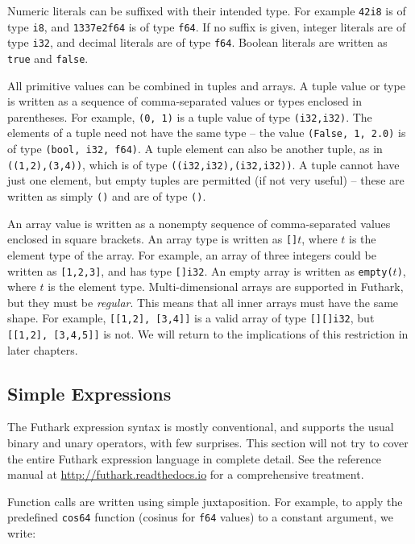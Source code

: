 \documentclass[11pt]{book}
\begin{document}
Numeric literals can be suffixed with their intended type.  For
example \texttt{42i8} is of type \texttt{i8}, and \texttt{1337e2f64}
is of type \texttt{f64}.  If no suffix is given, integer literals are
of type \texttt{i32}, and decimal literals are of type \texttt{f64}.
Boolean literals are written as \texttt{true} and \texttt{false}.

All primitive values can be combined in tuples and arrays.  A tuple
value or type is written as a sequence of comma-separated values or
types enclosed in parentheses.  For example, \texttt{(0, 1)} is a
tuple value of type \texttt{(i32,i32)}.  The elements of a tuple need
not have the same type -- the value \texttt{(False, 1, 2.0)} is of
type \texttt{(bool, i32, f64)}.  A tuple element can also be another
tuple, as in \texttt{((1,2),(3,4))}, which is of type
\texttt{((i32,i32),(i32,i32))}.  A tuple cannot have just one element,
but empty tuples are permitted (if not very useful) -- these are
written as simply \texttt{()} and are of type \texttt{()}.

An array value is written as a nonempty sequence of comma-separated
values enclosed in square brackets.  An array type is written as
\texttt{[]$t$}, where \texttt{$t$} is the element type of the array.
For example, an array of three integers could be written as
\texttt{[1,2,3]}, and has type \texttt{[]i32}.  An empty array is
written as \texttt{empty($t$)}, where \texttt{$t$} is the element
type.  Multi-dimensional arrays are supported in Futhark, but they
must be \textit{regular}.  This means that all inner arrays must have
the same shape.  For example, \texttt{[[1,2], [3,4]]} is a valid array
of type \texttt{[][]i32}, but \texttt{[[1,2], [3,4,5]]} is not.  We
will return to the implications of this restriction in later chapters.

\subsection{Simple Expressions}

The Futhark expression syntax is mostly conventional, and supports the
usual binary and unary operators, with few surprises.  This section
will not try to cover the entire Futhark expression language in
complete detail.  See the reference manual at
\url{http://futhark.readthedocs.io} for a comprehensive treatment.

Function calls are written using simple juxtaposition.  For example,
to apply the predefined \texttt{cos64} function (cosinus for
\texttt{f64} values) to a constant argument, we write:
\end{document}
